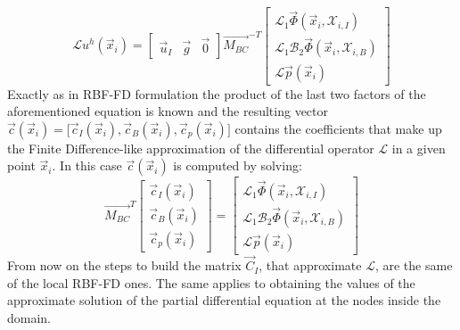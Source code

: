 \begin{equation}
	\label{eqn:FD_like_discretization_of_L_middle_step_RBF-HFD}
	\mathcal{L} u^h(\vec{x}_i) = 
	\begin{bmatrix}
		\vec{u}_I  &  \vec{g}  &  \vec{0}
	\end{bmatrix}
	\vec{M_{BC}}^{-T}
	\begin{bmatrix}
		\mathcal{L}_1 \vec{\Phi}(\vec{x}_i, \mathcal{X}_{i,I})  			  \\
		\mathcal{L}_1 \mathcal{B}_2 \vec{\Phi}(\vec{x}_i, \mathcal{X}_{i,B})  \\
		\mathcal{L} \vec{p}(\vec{x}_i)
	\end{bmatrix}	
\end{equation}
Exactly as in RBF-FD formulation the product of the last two factors of the aforementioned equation is known and the resulting vector $\vec{c}(\vec{x}_i) = \bigl[ \vec{c}_I(\vec{x}_i), \vec{c}_B(\vec{x}_i), \vec{c}_p(\vec{x}_i) \bigr]$ contains the coefficients that make up the Finite Difference-like approximation of the differential operator $ \mathcal{L}$ in a given point $\vec{x}_i$. In this case $\vec{c}(\vec{x}_i) $ is computed by solving:
\begin{equation}
	\label{eqn:row_of_C_system_in_RBF-HFD}
	\vec{M_{BC}}^T
	\begin{bmatrix}
		\vec{c}_I(\vec{x}_i)  \\
		\vec{c}_B(\vec{x}_i)  \\
		\vec{c}_p(\vec{x}_i)
	\end{bmatrix} = 
	\begin{bmatrix}
		\mathcal{L}_1 \vec{\Phi}(\vec{x}_i, \mathcal{X}_{i,I})  			  \\
		\mathcal{L}_1 \mathcal{B}_2 \vec{\Phi}(\vec{x}_i, \mathcal{X}_{i,B})  \\
		\mathcal{L} \vec{p}(\vec{x}_i)
	\end{bmatrix}
\end{equation}
From now on the steps to build the matrix $\vec{C}_I$, that approximate $\mathcal{L}$, are the same of the local RBF-FD ones. The same applies to obtaining the values of the approximate solution of the partial differential equation at the nodes inside the domain.









